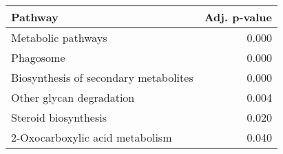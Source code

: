 \begin{tabular}{lr}
\toprule
                               Pathway &  Adj. p-value \\
\midrule
                    Metabolic pathways &         0.000 \\
                             Phagosome &         0.000 \\
 Biosynthesis of secondary metabolites &         0.000 \\
              Other glycan degradation &         0.004 \\
                  Steroid biosynthesis &         0.020 \\
       2-Oxocarboxylic acid metabolism &         0.040 \\
\bottomrule
\end{tabular}
